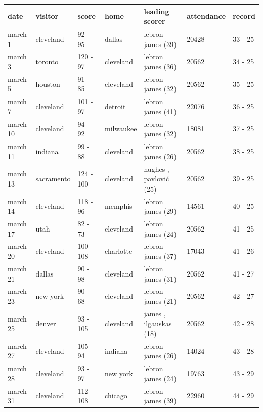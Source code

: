 \documentclass{article}
\begin{document}
\begin{tabular}{lllllll}
\toprule
date & visitor & score & home & leading scorer & attendance & record \\
\midrule
march 1 & cleveland & 92 - 95 & dallas & lebron james (39) & 20428 & 33 - 25 \\
march 3 & toronto & 120 - 97 & cleveland & lebron james (36) & 20562 & 34 - 25 \\
march 5 & houston & 91 - 85 & cleveland & lebron james (32) & 20562 & 35 - 25 \\
march 7 & cleveland & 101 - 97 & detroit & lebron james (41) & 22076 & 36 - 25 \\
march 10 & cleveland & 94 - 92 & milwaukee & lebron james (32) & 18081 & 37 - 25 \\
march 11 & indiana & 99 - 88 & cleveland & lebron james (26) & 20562 & 38 - 25 \\
march 13 & sacramento & 124 - 100 & cleveland & hughes , pavlović (25) & 20562 & 39 - 25 \\
march 14 & cleveland & 118 - 96 & memphis & lebron james (29) & 14561 & 40 - 25 \\
march 17 & utah & 82 - 73 & cleveland & lebron james (24) & 20562 & 41 - 25 \\
march 20 & cleveland & 100 - 108 & charlotte & lebron james (37) & 17043 & 41 - 26 \\
march 21 & dallas & 90 - 98 & cleveland & lebron james (31) & 20562 & 41 - 27 \\
march 23 & new york & 90 - 68 & cleveland & lebron james (21) & 20562 & 42 - 27 \\
march 25 & denver & 93 - 105 & cleveland & james , ilgauskas (18) & 20562 & 42 - 28 \\
march 27 & cleveland & 105 - 94 & indiana & lebron james (26) & 14024 & 43 - 28 \\
march 28 & cleveland & 93 - 97 & new york & lebron james (24) & 19763 & 43 - 29 \\
march 31 & cleveland & 112 - 108 & chicago & lebron james (39) & 22960 & 44 - 29 \\
\bottomrule
\end{tabular}
\end{document}
